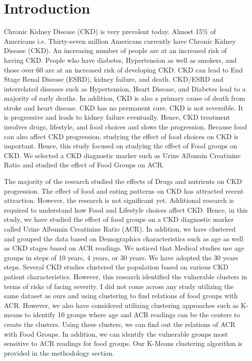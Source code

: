 \section{Introduction}

\flushleft \justifying Chronic Kidney Disease (CKD) is very prevalent today. Almost 15\% of Americans i.e. Thirty-seven million Americans currently have Chronic Kidney Disease (CKD). An increasing number of people are at an increased risk of having CKD. People who have diabetes, Hypertension as well as smokers, and those over 60 are at an increased risk of developing CKD. CKD can lead to End Stage Renal Disease (ESRD), kidney failure, and death. CKD/ESRD and interrelated diseases such as Hypertension, Heart Disease, and Diabetes lead to a majority of early deaths. In addition, CKD is also a primary cause of death from stroke and heart disease. CKD has no permanent cure. CKD is not reversible. It is progressive and leads to kidney failure eventually. Hence, CKD treatment involves drugs, lifestyle, and food choices and slows the progression. Because food can also affect CKD progression, studying the effect of food choices on CKD is important. Hence, this study focused on studying the effect of Food groups on CKD. We selected a CKD diagnostic marker such as Urine Albumin Creatinine Ratio and studied the effect of Food Groups on ACR.

\flushleft \justifying The majority of the research studied the effects of Drugs and nutrients on CKD progression. The effect of food and eating patterns on CKD has attracted recent attraction. However, the research is not significant yet. Additional research is required to understand how Food and Lifestyle choices affect CKD. Hence, in this study, we have studied the effect of food groups on a CKD diagnostic marker called Urine Albumin Creatinine Ratio (ACR). In addition, we have clustered and grouped the data based on Demographics characteristics such as age as well as CKD stages based on ACR readings. We noticed that Medical studies use age groups in steps of 10 years, 4 years, or 30 years. We have adopted the 30 years steps. Several CKD studies clustered the population based on various CKD patient characteristics. However, this research identified the vulnerable clusters in terms of risks of facing severity. I did not come across any study utilizing the same dataset as ours and using clustering to find relations of food groups with ACR. However, we also have considered utilizing clustering approaches such as K-means to identify 10 groups where age and ACR readings can be the centers to create the clusters. Using these clusters, we can find out the relations of ACR with Food Groups. In addition, we can identify the vulnerable groups most sensitive to ACR readings for food groups. Our K-Means clustering algorithm is provided in the methodology section.

